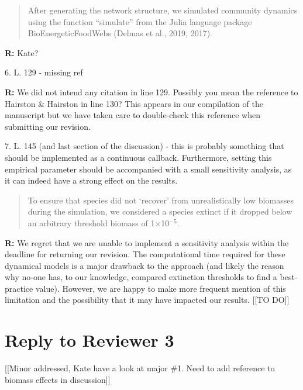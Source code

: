 \documentclass[12pt]{article}
\begin{document}
    \begin{quotation}
    After generating the network structure, we simulated community dynamics using the function ``simulate'' from the Julia language package BioEnergeticFoodWebs (Delmas et al., 2019, 2017).
    \end{quotation}

    \smallskip

    \textbf{R:} Kate?

    \smallskip

    6. L. 129 - missing ref

    \smallskip

    \textbf{R:} We did not intend any citation in line 129. Possibly you mean the reference to Hairston \& Hairston in line 130? This appears in our compilation of the manuscript but we have taken care to double-check this reference when submitting our revision.%

    \smallskip

    7. L. 145 (and last section of the discussion) - this is probably something that should be implemented as a continuous callback. Furthermore, setting this empirical parameter should be accompanied with a small sensitivity analysis, as it can indeed have a strong effect on the results.

    \smallskip

    \begin{quotation}
    To ensure that species did not ‘recover’ from unrealistically low biomasses during the simulation, we considered a species extinct if it dropped below an arbitrary threshold biomass of 1$\times$10$^{-5}$.
    \end{quotation}

    \textbf{R:} We regret that we are unable to implement a sensitivity analysis within the deadline for returning our revision. The computational time required for these dynamical models is a major drawback to the approach (and likely the reason why no-one has, to our knowledge, compared extinction thresholds to find a best-practice value). However, we are happy to make more frequent mention of this limitation and the possibility that it may have impacted our results. [[TO DO]]

\clearpage


\section*{Reply to Reviewer 3} [[Minor addressed, Kate have a look at major \#1. Need to add reference to biomass effects in discussion]]
\end{document}
